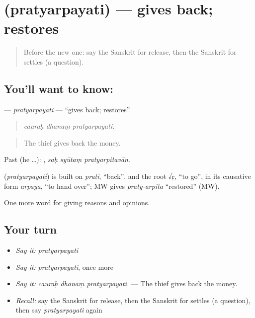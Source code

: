\section[\texorpdfstring{\sk{प्रत्यर्पयति} (pratyarpayati)}{प्रत्यर्पयति (pratyarpayati)}]{ (pratyarpayati) — gives back; restores}

\label{lesson:SA-C350-pratyarpayati}



\begin{quote}
Before the new one: say the Sanskrit for release, then the Sanskrit for settles (a question).
\end{quote}

\subsection*{You'll want to know: }
\textbf{} — \emph{pratyarpayati} — \textquotedblleft{}gives back; restores\textquotedblright{}.

\begin{quote}
  
\end{quote}

\begin{quote}
\emph{cauraḥ dhanaṃ pratyarpayati.}
\end{quote}

\begin{quote}
The thief gives back the money.
\end{quote}

Past (he …):   , \emph{saḥ syūtaṃ pratyarpitavān}.

\begin{cousinweb}
\textbf{} (\emph{pratyarpayati}) is built on \emph{prati}, \textquotedblleft{}back\textquotedblright{}, and the root √ṛ, \textquotedblleft{}to go\textquotedblright{}, in its causative form \emph{arpaya}, \textquotedblleft{}to hand over\textquotedblright{}; MW gives \emph{praty-arpita} \textquotedblleft{}restored\textquotedblright{} (MW).
\end{cousinweb}

\begin{grammarlens}[title={What you've built}]
One more word for giving reasons and opinions.
\end{grammarlens}

\subsection*{Your turn}
\begin{itemize}
\raggedright
  \item \emph{Say it:} \emph{pratyarpayati}
  \item \emph{Say it:} \emph{pratyarpayati}, once more
  \item \emph{Say it:} \emph{cauraḥ dhanaṃ pratyarpayati.} — The thief gives back the money.
  \item \emph{Recall:} say the Sanskrit for release, then the Sanskrit for settles (a question), then say \emph{pratyarpayati} again
\end{itemize}

